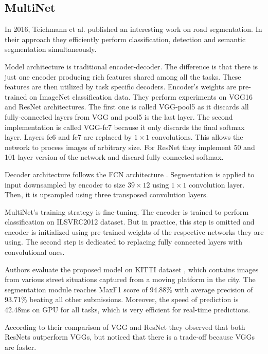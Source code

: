 \subsection{MultiNet}
\label{sec:semantic_seg_cnn:multinet}

In 2016, Teichmann et al. \cite{bib:teichmann2018multinet} published an interesting
work on road segmentation. In their approach they efficiently perform
classification, detection and semantic segmentation simultaneously.

Model architecture is traditional encoder-decoder. The difference is that there
is just one encoder producing rich features shared among all the tasks. These features
are then utilized by task specific decoders.
Encoder's weights are pre-trained on ImageNet classification data. They perform
experiments on VGG16 and ResNet architectures. The first one is called VGG-pool5
as it discards all fully-connected layers from VGG and pool5 is the last layer.
The second implementation is called VGG-fc7 because it only discards the final softmax
layer. Layers fc6 and fc7 are replaced by $1\times1$ convolutions. This allows the
network to process images of arbitrary size. For ResNet they implement 50 and 101
layer version of the network and discard fully-connected softmax.

Decoder architecture follows the FCN architecture \cite{bib:long2015fully}.
Segmentation is applied to input
downsampled by encoder to size $39\times12$ using $1\times1$ convolution layer. Then,
it is upsampled using three transposed convolution layers.

MultiNet's training strategy is fine-tuning. The encoder is trained to perform
classification on ILSVRC2012 dataset. But in practice, this step is omitted and
encoder is initialized using pre-trained weights of the respective networks they are using.
The second step is dedicated to replacing fully connected layers with
convolutional ones.

Authors evaluate the proposed model on KITTI dataset \cite{bib:Geiger2012CVPR},
which contains images
from various street situations captured from a moving platform in the city.
The segmentation module reaches MaxF1 score of 94.88\% with average precision of
93.71\% beating all other submissions. Moreover, the speed of prediction is 42.48ms on GPU
for all tasks, which is very efficient for real-time predictions.

According to their comparison of VGG and ResNet they observed that both ResNets
outperform VGGs, but noticed that there is a trade-off because VGGs are faster.

